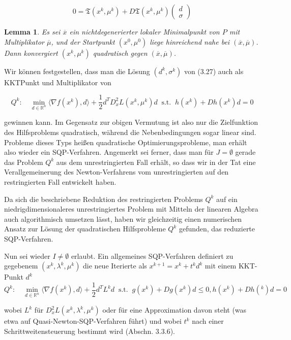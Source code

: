 \documentclass[11pt]{scrreprt}
\newcounter{thm}
\theoremstyle{thmstyle}
\numberwithin{thm}{section}
\newtheorem{lemma}[thm]{Lemma}
\begin{document}
\begin{equation}
	0 = \mathfrak{T}(x^k, \mu^k) + D \mathfrak{T}(x^k, \mu^k) \begin{pmatrix} d \\ \sigma \end{pmatrix} \tag*{(3.27)}
\end{equation} 

\begin{lemma}
	Es sei $\overline{x}$ ein nichtdegenerierter lokaler Minimalpunkt von $P$ mit Multiplikator $\overline{\mu}$, und der Startpunkt $(x^0, \mu^0)$ liege hinreichend nahe bei $(\overline{x}, \overline{\mu})$. Dann konvergiert $(x^k, \mu^k)$ quadratisch gegen $(\overline{x}, \overline{\mu})$.
\end{lemma}

Wir können festgestellen, dass man die Lösung $(d^k, \sigma^k)$ von (3.27) auch als KKTPunkt und Multiplikator von

	$$ Q^k \colon \quad \min_{d \in \mathbb{R}^n} \langle \nabla f(x^k), d \rangle + \frac{1}{2} d^T D_x^2 L(x^k, \mu^k) d ~\text{ s.t. }~ h(x^k) + D h(x^k) d = 0 $$

gewinnen kann. Im Gegensatz zur obigen Vermutung ist also nur die Zielfunktion des Hilfsproblems quadratisch, während die Nebenbedingungen sogar linear sind. Probleme dieses Typs heißen quadratische Optimierungsprobleme, man erhält also wieder ein SQP-Verfahren. Angemerkt sei ferner, dass man für $J = \emptyset$ gerade das Problem $Q^k$ aus dem unrestringierten Fall erhält, so dass wir in der Tat eine Verallgemeinerung des Newton-Verfahrens vom unrestringierten auf den restringierten Fall entwickelt haben. ~\bigskip

Da sich die beschriebene Reduktion des restringierten Problems $Q^k$ auf ein niedrigdimensionaleres unrestringiertes Problem mit Mitteln der linearen Algebra auch algorithmisch umsetzen lässt, haben wir gleichzeitig einen numerischen Ansatz zur Lösung der quadratischen Hilfsprobleme $Q^k$ gefunden, das reduzierte SQP-Verfahren. ~\bigskip

Nun sei wieder $I \neq \emptyset$ erlaubt. Ein allgemeines SQP-Verfahren definiert zu gegebenem $(x^k, \lambda^k, \mu^k)$ die neue Iterierte als $x^{k+1} = x^k + t^k d^k$ mit einem KKT-Punkt $d^k$
$$ Q^k \colon \quad \min_{d \in \mathbb{R}^n} \langle \nabla f(x^k), d \rangle + \frac{1}{2} d^T L^k d ~\text{ s.t. }~ g(x^k) + D g(x^k) d \leq 0, h(x^k) + D h(^k) d = 0 $$

wobei $L^k$ für $D_x^2 L(x^k, \lambda^k, \mu^k)$ oder für eine Approximation davon steht (was etwa auf Quasi-Newton-SQP-Verfahren führt) und wobei $t^k$ nach einer Schrittweitensteuerung bestimmt wird (Abschn. 3.3.6). ~\bigskip 
\end{document}
